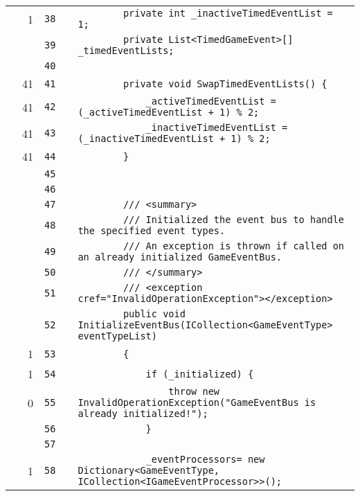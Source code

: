 \documentclass[a4paper,landscape,10pt]{article}
\begin{document}
\begin{longtable}[l]{lrrll}
\cellcolor{green} & 1 & \verb~38~ & & \verb~        private int _inactiveTimedEventList = 1;~\\
\cellcolor{gray} &  & \verb~39~ & & \verb~        private List<TimedGameEvent>[] _timedEventLists;~\\
\cellcolor{gray} &  & \verb~40~ & & \verb~~\\
\cellcolor{green} & 41 & \verb~41~ & & \verb~        private void SwapTimedEventLists() {~\\
\cellcolor{green} & 41 & \verb~42~ & & \verb~            _activeTimedEventList = (_activeTimedEventList + 1) % 2;~\\
\cellcolor{green} & 41 & \verb~43~ & & \verb~            _inactiveTimedEventList = (_inactiveTimedEventList + 1) % 2;~\\
\cellcolor{green} & 41 & \verb~44~ & & \verb~        }~\\
\cellcolor{gray} &  & \verb~45~ & & \verb~~\\
\cellcolor{gray} &  & \verb~46~ & & \verb~~\\
\cellcolor{gray} &  & \verb~47~ & & \verb~        /// <summary>~\\
\cellcolor{gray} &  & \verb~48~ & & \verb~        /// Initialized the event bus to handle the specified event types.~\\
\cellcolor{gray} &  & \verb~49~ & & \verb~        /// An exception is thrown if called on an already initialized GameEventBus.~\\
\cellcolor{gray} &  & \verb~50~ & & \verb~        /// </summary>~\\
\cellcolor{gray} &  & \verb~51~ & & \verb~        /// <exception cref="InvalidOperationException"></exception>~\\
\cellcolor{gray} &  & \verb~52~ & & \verb~        public void InitializeEventBus(ICollection<GameEventType> eventTypeList)~\\
\cellcolor{green} & 1 & \verb~53~ & & \verb~        {~\\
\cellcolor{orange} & 1 & \verb~54~ & & \verb~            if (_initialized) {~\\
\cellcolor{red} & 0 & \verb~55~ & & \verb~                throw new InvalidOperationException("GameEventBus is already initialized!");~\\
\cellcolor{gray} &  & \verb~56~ & & \verb~            }~\\
\cellcolor{gray} &  & \verb~57~ & & \verb~~\\
\cellcolor{green} & 1 & \verb~58~ & & \verb~            _eventProcessors= new Dictionary<GameEventType, ICollection<IGameEventProcessor>>();~\\

\end{longtable}
\end{document}
